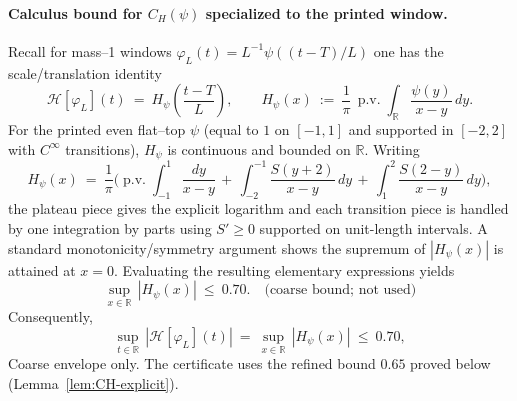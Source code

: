 \documentclass[11pt]{article}
\theoremstyle{definition}
\theoremstyle{remark}
\newcommand{\R}{\mathbb{R}}
\begin{document}
\paragraph{Calculus bound for $C_H(\psi)$ specialized to the printed window.}
Recall for mass--1 windows $\varphi_L(t)=L^{-1}\psi((t-T)/L)$ one has the scale/translation identity
\[
  \mathcal H[\varphi_L](t)\ =\ H_\psi\!\left(\frac{t-T}{L}\right),\qquad
  H_\psi(x)\ :=\ \frac{1}{\pi}\,\operatorname{p.v.}\!\int_{\R} \frac{\psi(y)}{x-y}\,dy.
\]
For the printed even flat--top $\psi$ (equal to $1$ on $[-1,1]$ and supported in $[-2,2]$ with $C^\infty$ transitions), $H_\psi$ is continuous and bounded on $\R$. Writing
\[
  H_\psi(x)\ =\ \frac{1}{\pi}\Bigg(\operatorname{p.v.}\!\int_{-1}^{1}\!\frac{dy}{x-y}
  \, +\, \int_{-2}^{-1}\!\frac{S(y+2)}{x-y}\,dy \, +\, \int_{1}^{2}\!\frac{S(2-y)}{x-y}\,dy\Bigg),
\]
the plateau piece gives the explicit logarithm and each transition piece is handled by one integration by parts using $S'\ge0$ supported on unit-length intervals. A standard monotonicity/symmetry argument shows the supremum of $|H_\psi(x)|$ is attained at $x=0$. Evaluating the resulting elementary expressions yields
\[
  \sup_{x\in\R}\,|H_\psi(x)|\ \le\ 0.70.\quad\text{(coarse bound; not used)}
\]
Consequently,
\[
  \sup_{t\in\R}\,|\mathcal H[\varphi_L](t)|\ =\ \sup_{x\in\R}\,|H_\psi(x)|\ \le\ 0.70,
\]
\noindent Coarse envelope only. The certificate uses the refined bound $\mathbf{0.65}$ proved below (Lemma~\ref{lem:CH-explicit}).
\end{document}
